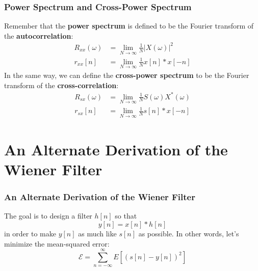 \documentclass{beamer}
\begin{document}
\begin{frame}
  \frametitle{Power Spectrum and Cross-Power Spectrum}

  Remember that the {\bf power spectrum} is defined to be the Fourier
  transform of the {\bf autocorrelation}:
  \begin{align*}
    R_{xx}(\omega)&=\lim_{N\rightarrow\infty}\frac{1}{N} |X(\omega)|^2\\
    r_{xx}[n] &=\lim_{N\rightarrow\infty}\frac{1}{N} x[n]\ast x[-n]
  \end{align*}
  In the same way, we can define the {\bf cross-power spectrum} to be
  the Fourier transform of the {\bf cross-correlation}:
  \begin{align*}
    R_{sx}(\omega)&=\lim_{N\rightarrow\infty}\frac{1}{N} S(\omega)X^*(\omega)\\
    r_{sx}[n] &=\lim_{N\rightarrow\infty}\frac{1}{N} s[n]\ast x[-n]
  \end{align*}
\end{frame}

\section[Derivation]{An Alternate Derivation of the Wiener Filter}
\setcounter{subsection}{1}

\begin{frame}
  \frametitle{An Alternate Derivation of the Wiener Filter}

  The goal is to design a filter $h[n]$ so that
  \begin{displaymath}
    y[n]=x[n]\ast h[n]
  \end{displaymath}
  in order to make $y[n]$ as much like $s[n]$ as possible.  In other
  words, let's minimize the mean-squared error:
  \begin{displaymath}
    {\mathcal E}=\sum_{n=-\infty}^\infty E\left[\left(s[n]-y[n]\right)^2\right]
  \end{displaymath}
\end{frame}
\end{document}
